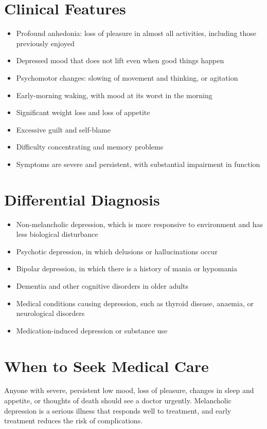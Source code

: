 \section*{Clinical Features}
\begin{itemize}
    \item Profound anhedonia: loss of pleasure in almost all activities, including those previously enjoyed
    \item Depressed mood that does not lift even when good things happen
    \item Psychomotor changes: slowing of movement and thinking, or agitation
    \item Early-morning waking, with mood at its worst in the morning
    \item Significant weight loss and loss of appetite
    \item Excessive guilt and self-blame
    \item Difficulty concentrating and memory problems
    \item Symptoms are severe and persistent, with substantial impairment in function
\end{itemize}

\section*{Differential Diagnosis}
\begin{itemize}
    \item Non-melancholic depression, which is more responsive to environment and has less biological disturbance
    \item Psychotic depression, in which delusions or hallucinations occur
    \item Bipolar depression, in which there is a history of mania or hypomania
    \item Dementia and other cognitive disorders in older adults
    \item Medical conditions causing depression, such as thyroid disease, anaemia, or neurological disorders
    \item Medication-induced depression or substance use
\end{itemize}

\section*{When to Seek Medical Care}
Anyone with severe, persistent low mood, loss of pleasure, changes in sleep and appetite, or thoughts of death should see a doctor urgently. Melancholic depression is a serious illness that responds well to treatment, and early treatment reduces the risk of complications.

